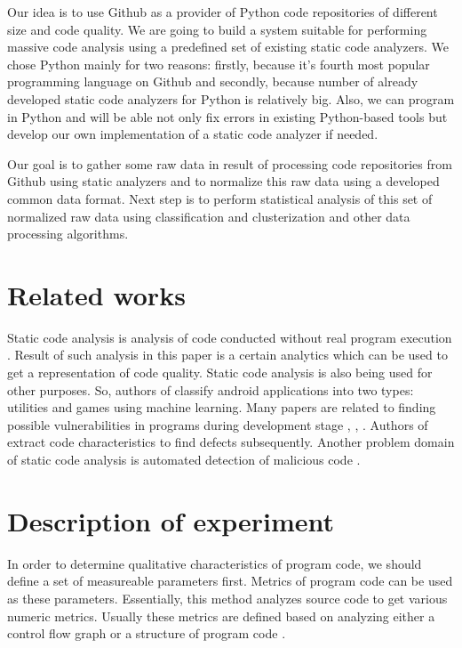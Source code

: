 \documentclass[runningheads,a4paper]{llncs}
\begin{document}
Our idea is to use Github \cite{item16} as a provider of Python code repositories
of different size and code quality. We are going to build a system suitable for
performing massive code analysis using a predefined set of existing static code
analyzers. We chose Python mainly for two reasons: firstly, because it's fourth most popular
programming language on Github and secondly, because number of already developed
static code analyzers for Python is relatively big. Also, we can program in Python
and will be able not only fix errors in existing Python-based tools but develop
our own implementation of a static code analyzer if needed.

Our goal is to gather some raw data in result of processing code repositories from
Github using static analyzers and to normalize this raw data using a developed
common data format. Next step is to perform statistical analysis of this set of
normalized raw data using classification and clusterization and other data processing
algorithms.

\section{Related works}

Static code analysis is analysis of code conducted without real program
execution \cite{item05}. Result of such analysis in this paper is a certain analytics
which can be used to get a representation of code quality. Static code analysis
is also being used for other purposes. So, authors of \cite{item06} classify android
applications into two types: utilities and games using machine learning.
Many papers are related to finding possible vulnerabilities in programs
during development stage \cite{item07}, \cite{item08}, \cite{item09}. Authors of \cite{item10} extract code characteristics
to find defects subsequently. Another problem domain of static code analysis
is automated detection of malicious code \cite{item11}.

\section{Description of experiment}

In order to determine qualitative characteristics of program code, we should
define a set of measureable parameters first. Metrics of program code can
be used as these parameters. Essentially, this method analyzes source code
to get various numeric metrics. Usually these metrics are defined based
on analyzing either a control flow graph or a structure of program code \cite{item12}.
\end{document}
